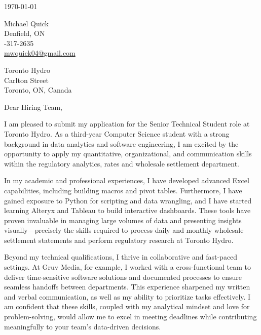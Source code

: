 \documentclass[11pt]{article}
\begin{document}
\begin{flushright}
\today
\end{flushright}

\noindent Michael Quick \\
\noindent Denfield, ON \\
-317-2635 \\
\noindent \href{mailto:mwquick04@gmail.com}{mwquick04@gmail.com} \\

\vspace{1em}

\noindent Toronto Hydro \\
 Carlton Street \\
\noindent Toronto, ON, Canada

\vspace{2em}

\noindent Dear Hiring Team,

\setlength{\parindent}{15pt}
\setlength{\parskip}{0.75em}

I am pleased to submit my application for the Senior Technical Student role at Toronto Hydro. As a third-year Computer Science student with a strong background in data analytics and software engineering, I am excited by the opportunity to apply my quantitative, organizational, and communication skills within the regulatory analytics, rates and wholesale settlement department.

In my academic and professional experiences, I have developed advanced Excel capabilities, including building macros and pivot tables. Furthermore, I have gained exposure to Python for scripting and data wrangling, and I have started learning Alteryx and Tableau to build interactive dashboards. These tools have proven invaluable in managing large volumes of data and presenting insights visually—precisely the skills required to process daily and monthly wholesale settlement statements and perform regulatory research at Toronto Hydro.

Beyond my technical qualifications, I thrive in collaborative and fast-paced settings. At Gruv Media, for example, I worked with a cross-functional team to deliver time-sensitive software solutions and documented processes to ensure seamless handoffs between departments. This experience sharpened my written and verbal communication, as well as my ability to prioritize tasks effectively. I am confident that these skills, coupled with my analytical mindset and love for problem-solving, would allow me to excel in meeting deadlines while contributing meaningfully to your team’s data-driven decisions.
\end{document}
